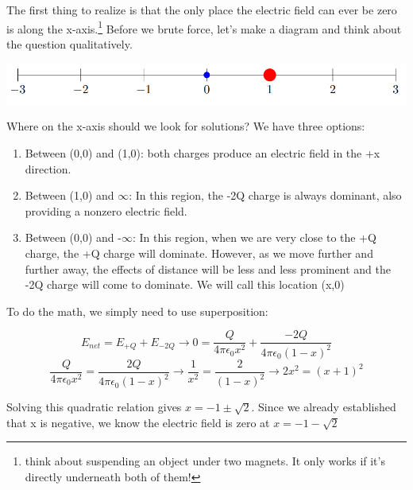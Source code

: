 \begin{solution}
The first thing to realize is that the only place the electric field can ever be zero is along the x-axis.\footnote{think about suspending an object under two magnets. It only works if it's directly underneath both of them!} Before we brute force, let's make a diagram and think about the question qualitatively.

\begin{center}
\includegraphics{Figures/Figure27}
\end{center}
Where on the x-axis should we look for solutions? We have three options:
\begin{enumerate}
    \item Between (0,0) and (1,0): both charges produce an electric field in the +x direction.
    \item Between (1,0) and $\infty$: In this region, the -2Q charge is always dominant, also providing a nonzero electric field.
    \item Between (0,0) and -$\infty$: In this region, when we are very close to the +Q charge, the +Q charge will dominate. However, as we move further and further away, the effects of distance will be less and less prominent and the -2Q charge will come to dominate. We will call this location (x,0)
\end{enumerate}
 
To do the math, we simply need to use superposition:

\begin{equation}
    E_{net} = E_{+Q} + E_{-2Q} \rightarrow
    0 = \frac{Q}{4\pi\epsilon_0x^2} + 
        \frac{-2Q}{4\pi\epsilon_0(1-x)^2}
\end{equation}
\begin{equation}
    \frac{Q}{4\pi\epsilon_0x^2} = 
    \frac{2Q}{4\pi\epsilon_0(1-x)^2} \rightarrow
    \frac{1}{x^2} = \frac{2}{(1-x)^2} \rightarrow
    2x^2 = (x+1)^2
\end{equation}

Solving this quadratic relation gives $x=-1\pm\sqrt{2}$. Since we already established that x is negative, we know the electric field is zero at $x=-1-\sqrt{2}$

\end{solution}

